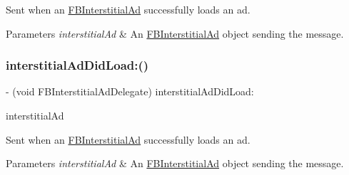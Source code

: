 Sent when an \hyperlink{interfaceFBInterstitialAd}{F\+B\+Interstitial\+Ad} successfully loads an ad.


\begin{DoxyParams}{Parameters}
{\em interstitial\+Ad} & An \hyperlink{interfaceFBInterstitialAd}{F\+B\+Interstitial\+Ad} object sending the message. \\
\hline
\end{DoxyParams}
\mbox{\label{protocolFBInterstitialAdDelegate_01-p_a6e42af81b5d6382056651aee8b71c720}} 
\subsubsection{\texorpdfstring{interstitial\+Ad\+Did\+Load\+:()}{interstitialAdDidLoad:()}\hspace{0.1cm}{\footnotesize\ttfamily [5/5]}}
{\footnotesize\ttfamily -\/ (void F\+B\+Interstitial\+Ad\+Delegate) interstitial\+Ad\+Did\+Load\+: \begin{DoxyParamCaption}\item[{(\hyperlink{interfaceFBInterstitialAd}{F\+B\+Interstitial\+Ad} $\ast$)}]{interstitial\+Ad }\end{DoxyParamCaption}\hspace{0.3cm}{\ttfamily [optional]}}

Sent when an \hyperlink{interfaceFBInterstitialAd}{F\+B\+Interstitial\+Ad} successfully loads an ad.


\begin{DoxyParams}{Parameters}
{\em interstitial\+Ad} & An \hyperlink{interfaceFBInterstitialAd}{F\+B\+Interstitial\+Ad} object sending the message. \\
\hline
\end{DoxyParams}
\mbox{\label{protocolFBInterstitialAdDelegate_01-p_a9552e934440e2bbb01f09b7eb2e3a5a3}} 
